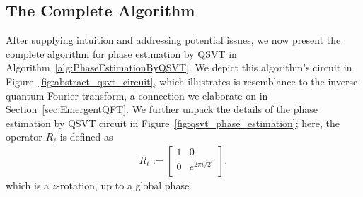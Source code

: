 \documentclass[aps,pra,showpacs,notitlepage,twocolumn,superscriptaddress,nofootinbib]{revtex4-1}
\begin{document}
    
    
    
    
    
    
    
    
    \subsection{The Complete Algorithm}

    After supplying intuition and addressing potential issues, we now present the complete algorithm for phase estimation by QSVT in Algorithm~\ref{alg:PhaseEstimationByQSVT}. We depict this algorithm's circuit in Figure~\ref{fig:abstract_qsvt_circuit}, which illustrates is resemblance to the inverse quantum Fourier transform, a connection we elaborate on in Section~\ref{sec:EmergentQFT}. We further unpack the details of the phase estimation by QSVT circuit in Figure~\ref{fig:qsvt_phase_estimation}; here, the operator $R_{\ell}$ is defined as
    \begin{equation}\label{eq:R_l}
    \begin{split}
        R_{\ell} := \begin{bmatrix}
            1 & 0 \\
            0 & e^{2\pi i/2^\ell } \\
        \end{bmatrix},
    \end{split}
    \end{equation}
    which is a $z$-rotation, up to a global phase.
    
\end{document}
